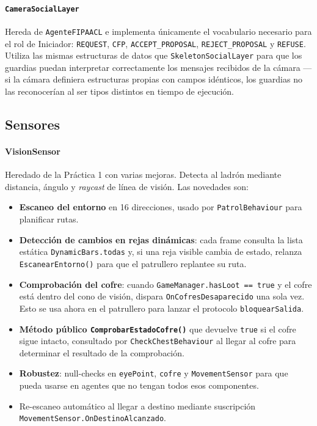 \documentclass[a4paper,12pt]{article}
\begin{document}
\paragraph{\texttt{CameraSocialLayer}} Hereda de \texttt{AgenteFIPAACL} e implementa únicamente el vocabulario necesario para el rol de Iniciador: \texttt{REQUEST}, \texttt{CFP}, \texttt{ACCEPT\_PROPOSAL}, \texttt{REJECT\_PROPOSAL} y \texttt{REFUSE}. Utiliza las mismas estructuras de datos que \texttt{SkeletonSocialLayer} para que los guardias puedan interpretar correctamente los mensajes recibidos de la cámara — si la cámara definiera estructuras propias con campos idénticos, los guardias no las reconocerían al ser tipos distintos en tiempo de ejecución.

\subsection*{Sensores}

\paragraph{VisionSensor}
Heredado de la Práctica 1 con varias mejoras. Detecta al ladrón mediante distancia, ángulo y \textit{raycast} de línea de visión. Las novedades son:

\begin{itemize}
    \item \textbf{Escaneo del entorno} en 16 direcciones, usado por \texttt{PatrolBehaviour} para planificar rutas.
    \item \textbf{Detección de cambios en rejas dinámicas}: cada frame consulta la lista estática \texttt{DynamicBars.todas} y, si una reja visible cambia de estado, relanza \texttt{EscanearEntorno()} para que el patrullero replantee su ruta.
    \item \textbf{Comprobación del cofre}: cuando \texttt{GameManager.hasLoot == true} y el cofre está dentro del cono de visión, dispara \texttt{OnCofresDesaparecido} una sola vez. Esto se usa ahora en el patrullero para lanzar el protocolo \texttt{bloquearSalida}.
    \item \textbf{Método público \texttt{ComprobarEstadoCofre()}} que devuelve \texttt{true} si el cofre sigue intacto, consultado por \texttt{CheckChestBehaviour} al llegar al cofre para determinar el resultado de la comprobación.
    \item \textbf{Robustez}: null-checks en \texttt{eyePoint}, \texttt{cofre} y \texttt{MovementSensor} para que pueda usarse en agentes que no tengan todos esos componentes.
    \item Re-escaneo automático al llegar a destino mediante suscripción \texttt{MovementSensor.\allowbreak OnDestinoAlcanzado}.
\end{itemize}
\end{document}
